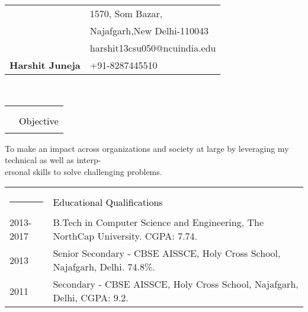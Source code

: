 \documentclass[12pt]{article}
\begin{document}
	\bgroup 
	\def\arraystretch{1.3}
	
	\begin{tabular}{ll}{\hspace{29em}}
		& \large {1570, Som Bazar,} \\
		& \large {Najafgarh,New Delhi-110043} \\
		& \large {harshit13csu050@ncuindia.edu} \\
		\Huge \textbf{Harshit Juneja} & \large {+91-8287445510}\\
	\end{tabular}\\
	
	\begin{tabular}{ll}{\hspace{10em}}\\
		\textcolor{lightgray}{\rule{2.7cm}{4pt}} & \textcolor{black}{\LARGE{Objective}} \\
	\end{tabular}
		\begin{changemargin}{0.9cm}{-1.0cm}
			\textmd{To make an impact across organizations and society at large by leveraging my technical as well as interp-}\\
			\textmd{ersonal skills to solve challenging problems.} 
		\end{changemargin}
		
	\begin{tabular}{ll}{\hspace{10em}}\\
			\textcolor{lightgray}{\rule{2.7cm}{4pt}} & \textcolor{black}{\LARGE{Educational Qualifications}}\\
			\textmd{2013-2017} & \textmd{B.Tech in Computer Science and Engineering, The NorthCap University. CGPA: 7.74.}\\
			\textmd{2013} & \textmd{Senior Secondary - CBSE AISSCE, Holy Cross School, Najafgarh, Delhi. 74.8\%.}\\
			\textmd{2011} & \textmd{Secondary - CBSE AISSCE, Holy Cross School, Najafgarh, Delhi, CGPA: 9.2.}
			
	\end{tabular}
	
\end{document}
